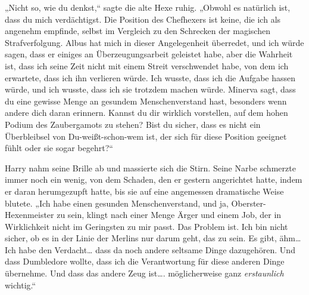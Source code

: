 „Nicht so, wie du denkst,“ sagte die alte Hexe ruhig. „Obwohl es natürlich ist, dass du mich verdächtigst. Die Position des Chefhexers ist keine, die ich als angenehm empfinde, selbst im Vergleich zu den Schrecken der magischen Strafverfolgung. Albus hat mich in dieser Angelegenheit überredet, und ich würde sagen, dass er einiges an Überzeugungsarbeit geleistet habe, aber die Wahrheit ist, dass ich seine Zeit nicht mit einem Streit verschwendet habe, von dem ich erwartete, dass ich ihn verlieren würde. Ich wusste, dass ich die Aufgabe hassen würde, und ich wusste, dass ich sie trotzdem machen würde. Minerva sagt, dass du eine gewisse Menge an gesundem Menschenverstand hast, besonders wenn andere dich daran erinnern. Kannst du dir wirklich vorstellen, auf dem hohen Podium des Zaubergamots zu stehen? Bist du sicher, dass es nicht ein Überbleibsel von Du-weißt-schon-wem ist, der sich für diese Position geeignet fühlt oder sie sogar begehrt?“

Harry nahm seine Brille ab und massierte sich die Stirn. Seine Narbe schmerzte immer noch ein wenig, von dem Schaden, den er gestern angerichtet hatte, indem er daran herumgezupft hatte, bis sie auf eine angemessen dramatische Weise blutete.
„Ich habe einen gesunden Menschenverstand, und ja, Oberster-Hexenmeister zu sein, klingt nach einer Menge Ärger und einem Job, der in Wirklichkeit nicht im Geringsten zu mir passt. Das Problem ist. Ich bin nicht sicher, ob es in der Linie der Merlins nur darum geht, das zu sein. Es gibt, ähm… Ich habe den Verdacht… dass da noch andere seltsame Dinge dazugehören. Und dass Dumbledore wollte, dass ich die Verantwortung für diese anderen Dinge übernehme. Und dass das andere Zeug ist…. möglicherweise ganz \emph{erstaunlich} wichtig.“

